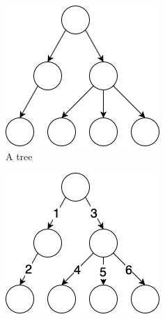 \begin{figure}[h!]
  \centering
  \begin{subfigure}[b]{0.18\linewidth}
    \includegraphics[width=\linewidth]{images/tree_example.png}
     \caption{A tree}
  \end{subfigure}
  \hfill
  \begin{subfigure}[b]{0.18\linewidth}
    \includegraphics[width=\linewidth]{images/dfs.png}

\end{subfigure}
\end{figure}
